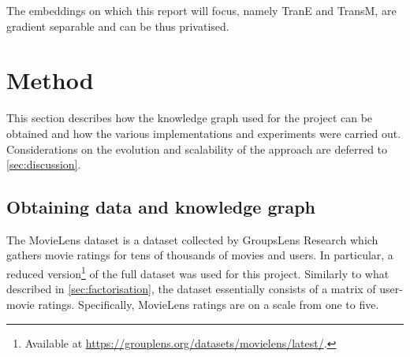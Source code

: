 The embeddings on which this report will focus, namely TranE and TransM, are gradient separable and can be thus privatised.




\section{Method}

This section describes how the knowledge graph used for the project can be obtained and how the various implementations and experiments were carried out.
Considerations on the evolution and scalability of the approach are deferred to \cref{sec:discussion}.

\subsection{Obtaining data and knowledge graph}\label{sec:creation}

The MovieLens dataset is a dataset collected by GroupsLens Research which gathers movie ratings for tens of thousands of movies and users.
In particular, a reduced version\footnote{Available at \href{https://grouplens.org/datasets/movielens/latest/}{https://grouplens.org/datasets/movielens/latest/}.} of the full dataset was used for this project.
Similarly to what described in \cref{sec:factorisation}, the dataset essentially consists of a matrix of user-movie ratings.
Specifically, MovieLens ratings are on a scale from one to five.

